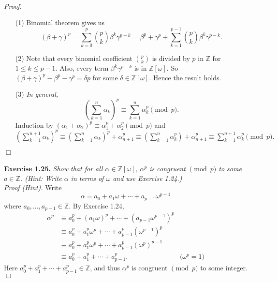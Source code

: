 \documentclass{article}
\begin{document}
\emph{Proof.}
\begin{enumerate}
\item[(1)]
Binomial theorem gives us
$$
(\beta+\gamma)^p
= \sum_{k=0}^{p}{p \choose k}\beta^k\gamma^{p-k}
= \beta^p+\gamma^p + \sum_{k=1}^{p-1}{p \choose k}\beta^k\gamma^{p-k}.$$
\item[(2)]
Note that every binomial coefficient ${p \choose k}$ is divided by $p$ in $\mathbb{Z}$
for $1 \leq k \leq p-1$.
Also, every term $\beta^k\gamma^{p-k}$ is in $\mathbb{Z}[\omega]$.
So $(\beta+\gamma)^p - \beta^p - \gamma^p = \delta p$
for some $\delta \in \mathbb{Z}[\omega]$.
Hence the result holds.
\item[(3)]
\emph{In general,}
$$\left( \sum_{k=1}^{n} \alpha_k \right)^p
\equiv \sum_{k=1}^{n} \alpha_k^p \pmod{p}.$$
Induction by
$(\alpha_1+\alpha_2)^p \equiv \alpha_1^p + \alpha_2^p \pmod{p}$
and
$\left( \sum_{k=1}^{n+1} \alpha_k \right)^p
\equiv \left( \sum_{k=1}^{n} \alpha_k \right)^p + \alpha_{n+1}^p
\equiv \left( \sum_{k=1}^{n} \alpha_k^p \right) + \alpha_{n+1}^p
\equiv \sum_{k=1}^{n+1} \alpha_k^p \pmod{p}.$
\end{enumerate}
$\Box$ \\\\






\textbf{Exercise 1.25.}
\emph{Show that for all $\alpha \in \mathbb{Z}[\omega]$,
$\alpha^p$ is congruent $\pmod{p}$ to some $a \in \mathbb{Z}$.
(Hint: Write $\alpha$ in terms of $\omega$ and use Exercise 1.24.) } \\

\emph{Proof (Hint).}
Write $$\alpha = a_0 + a_1 \omega + \cdots + a_{p-1} \omega^{p-1}$$
where $a_0, \ldots, a_{p-1} \in \mathbb{Z}$.
By Exercise 1.24,
\begin{align*}
\alpha^p
&\equiv a_0^p + (a_1 \omega)^p + \cdots + (a_{p-1} \omega^{p-1})^p \\
&\equiv a_0^p + a_1^p \omega^p + \cdots + a_{p-1}^p (\omega^{p-1})^p \\
&\equiv a_0^p + a_1^p \omega^p + \cdots + a_{p-1}^p (\omega^p)^{p-1} \\
&\equiv a_0^p + a_1^p + \cdots + a_{p-1}^p.
  &\text{($\omega^p = 1$)}
\end{align*}
Here $a_0^p + a_1^p + \cdots + a_{p-1}^p \in \mathbb{Z}$,
and thus $\alpha^p$ is congruent $\pmod{p}$ to some integer.
$\Box$ \\\\
\end{document}
